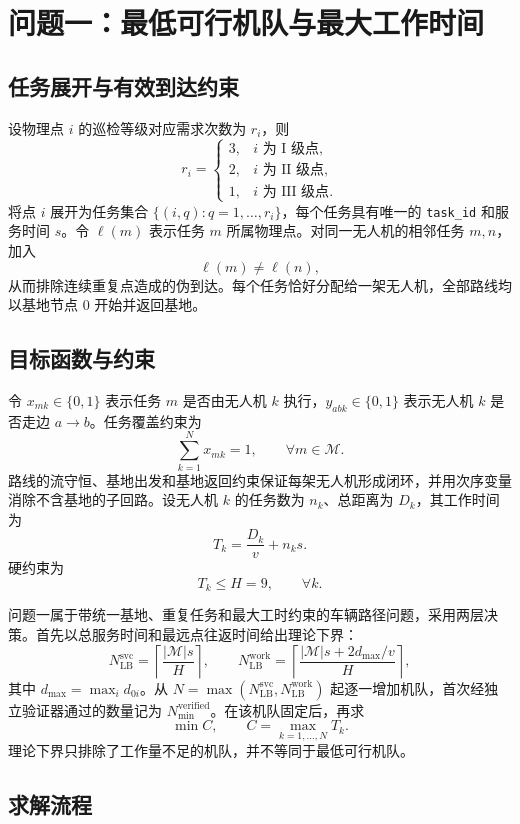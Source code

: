 \section{问题一：最低可行机队与最大工作时间}

\subsection{任务展开与有效到达约束}

设物理点 $i$ 的巡检等级对应需求次数为 $r_i$，则
\[
r_i=\begin{cases}3,&i\text{ 为 I 级点},\\2,&i\text{ 为 II 级点},\\1,&i\text{ 为 III 级点}.
\end{cases}
\]
将点 $i$ 展开为任务集合 $\{(i,q):q=1,\ldots,r_i\}$，每个任务具有唯一的 \texttt{task\_id} 和服务时间 $s$。令 $\ell(m)$ 表示任务 $m$ 所属物理点。对同一无人机的相邻任务 $m,n$，加入
\[
\ell(m)\neq \ell(n),
\]
从而排除连续重复点造成的伪到达。每个任务恰好分配给一架无人机，全部路线均以基地节点 $0$ 开始并返回基地。

\subsection{目标函数与约束}

令 $x_{mk}\in\{0,1\}$ 表示任务 $m$ 是否由无人机 $k$ 执行，$y_{abk}\in\{0,1\}$ 表示无人机 $k$ 是否走边 $a\to b$。任务覆盖约束为
\[
\sum_{k=1}^{N}x_{mk}=1,\qquad \forall m\in\mathcal M.
\]
路线的流守恒、基地出发和基地返回约束保证每架无人机形成闭环，并用次序变量消除不含基地的子回路。设无人机 $k$ 的任务数为 $n_k$、总距离为 $D_k$，其工作时间为
\[
T_k=\frac{D_k}{v}+n_ks.
\]
硬约束为
\[
T_k\leq H=9,\qquad \forall k.
\]

问题一属于带统一基地、重复任务和最大工时约束的车辆路径问题\cite{dantzig1959}，采用两层决策。首先以总服务时间和最远点往返时间给出理论下界：
\[
N_{\mathrm{LB}}^{\mathrm{svc}}
=\left\lceil\frac{|\mathcal M|s}{H}\right\rceil,
\qquad
N_{\mathrm{LB}}^{\mathrm{work}}
=\left\lceil\frac{|\mathcal M|s+2d_{\max}/v}{H}\right\rceil,
\]
其中 $d_{\max}=\max_i d_{0i}$。从 $N=\max(N_{\mathrm{LB}}^{\mathrm{svc}},N_{\mathrm{LB}}^{\mathrm{work}})$ 起逐一增加机队，首次经独立验证器通过的数量记为 $N_{\min}^{\mathrm{verified}}$。在该机队固定后，再求
\[
\min C,\qquad C=\max_{k=1,\ldots,N}T_k.
\]
理论下界只排除了工作量不足的机队，并不等同于最低可行机队。

\subsection{求解流程}

